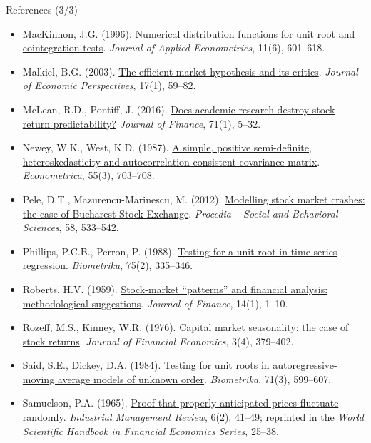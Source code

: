 \begin{frame}{References (3/3)}
\itemsize{\tiny}
\begin{itemize}
    \item MacKinnon, J.G. (1996). \href{https://doi.org/10.1002/(SICI)1099-1255(199611)11:6<601::AID-JAE417>3.0.CO;2-T}{Numerical distribution functions for unit root and cointegration tests}. \textit{Journal of Applied Econometrics}, 11(6), 601--618.
    \item Malkiel, B.G. (2003). \href{https://doi.org/10.1257/089533003321164958}{The efficient market hypothesis and its critics}. \textit{Journal of Economic Perspectives}, 17(1), 59--82.
    \item McLean, R.D., Pontiff, J. (2016). \href{https://doi.org/10.1111/jofi.12365}{Does academic research destroy stock return predictability?} \textit{Journal of Finance}, 71(1), 5--32.
    \item Newey, W.K., West, K.D. (1987). \href{https://doi.org/10.2307/1913610}{A simple, positive semi-definite, heteroskedasticity and autocorrelation consistent covariance matrix}. \textit{Econometrica}, 55(3), 703--708.
    \item Pele, D.T., Mazurencu-Marinescu, M. (2012). \href{https://doi.org/10.1016/j.sbspro.2012.09.1030}{Modelling stock market crashes: the case of Bucharest Stock Exchange}. \textit{Procedia -- Social and Behavioral Sciences}, 58, 533--542.
    \item Phillips, P.C.B., Perron, P. (1988). \href{https://doi.org/10.1093/biomet/75.2.335}{Testing for a unit root in time series regression}. \textit{Biometrika}, 75(2), 335--346.
    \item Roberts, H.V. (1959). \href{https://doi.org/10.1111/j.1540-6261.1959.tb00481.x}{Stock-market ``patterns'' and financial analysis: methodological suggestions}. \textit{Journal of Finance}, 14(1), 1--10.
    \item Rozeff, M.S., Kinney, W.R. (1976). \href{https://doi.org/10.1016/0304-405X(76)90028-3}{Capital market seasonality: the case of stock returns}. \textit{Journal of Financial Economics}, 3(4), 379--402.
    \item Said, S.E., Dickey, D.A. (1984). \href{https://doi.org/10.1093/biomet/71.3.599}{Testing for unit roots in autoregressive-moving average models of unknown order}. \textit{Biometrika}, 71(3), 599--607.
    \item Samuelson, P.A. (1965). \href{https://doi.org/10.1142/9789814566926_0002}{Proof that properly anticipated prices fluctuate randomly}. \textit{Industrial Management Review}, 6(2), 41--49; reprinted in the \textit{World Scientific Handbook in Financial Economics Series}, 25--38.

\end{itemize}
\end{frame}
